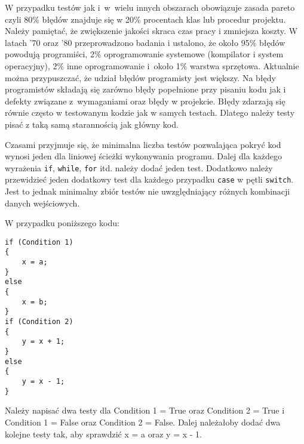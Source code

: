 W przypadku testów jak i~w~wielu innych obszarach obowiązuje zasada pareto czyli 80\% błędów znajduje się w 20\% procentach klas lub procedur projektu. Należy pamiętać, że zwiększenie jakości skraca czas pracy i zmniejsza koszty. W latach '70 oraz '80 przeprowadzono badania i ustalono, że około 95\% błędów powodują programiści, 2\% oprogramowanie systemowe (kompilator i system operacyjny), 2\% inne oprogramowanie i~około 1\% warstwa sprzętowa. Aktualnie można przypuszczać, że udział błędów programisty jest większy. Na błędy programistów składają się zarówno błędy popełnione przy pisaniu kodu jak i defekty związane z~wymaganiami oraz błędy w projekcie. Błędy zdarzają się równie często w testowanym kodzie jak w samych testach. Dlatego należy testy pisać z taką samą starannością jak główny kod. 

Czasami przyjmuje się, że minimalna liczba testów pozwalająca pokryć kod wynosi jeden dla liniowej ścieżki wykonywania programu. Dalej dla każdego wyrażenia \texttt{if}, \texttt{while}, \texttt{for} itd. należy dodać jeden test. Dodatkowo należy przewidzieć jeden dodatkowy test dla każdego przypadku \texttt{case} w pętli \texttt{switch}. Jest to jednak minimalny zbiór testów nie uwzględniający różnych kombinacji danych wejściowych. 

W przypadku poniższego kodu:
\begin{lstlisting}[caption={Testowanie przepływu danych}, label={lab5/lst/unitTestPaths}]
if (Condition 1)
{
	x = a;
}
else
{
	x = b;
}
if (Condition 2)
{
	y = x + 1;
}
else
{
	y = x - 1;
}
\end{lstlisting}
Należy napisać dwa testy dla Condition 1 = True oraz Condition 2 = True i Condition 1 = False oraz Condition 2 = False. Dalej należałoby  dodać dwa kolejne testy tak, aby sprawdzić x = a oraz y = x - 1.
  


